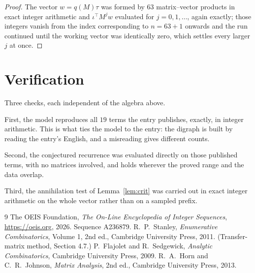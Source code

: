 \documentclass[11pt,a4paper]{article}
\theoremstyle{plain}
\theoremstyle{definition}
\begin{document}
\begin{proof}
The vector $w=q(M)\tau$ was formed by $63$ matrix--vector products in exact integer
arithmetic and $\iota^{\!\top}M^{j}w$ evaluated for $j=0,1,\dots$, again exactly; those
integers vanish from the index corresponding to $n=63+1$ onwards and the run continued
until the working vector was identically zero, which settles every larger $j$ at once.
\end{proof}

\section{Verification}

Three checks, each independent of the algebra above.

First, the model reproduces all $19$ terms the entry publishes, exactly, in integer
arithmetic. This is what ties the model to the entry: the digraph is built by reading the
entry's English, and a misreading gives different counts.

Second, the conjectured recurrence was evaluated directly on those published terms, with no
matrices involved, and holds wherever the proved range and the data overlap.

Third, the annihilation test of Lemma~\ref{lem:crit} was carried out in exact integer
arithmetic on the whole vector rather than on a sampled prefix.

\begin{thebibliography}{9}
 The OEIS Foundation, \emph{The On-Line Encyclopedia of Integer
Sequences}, \url{https://oeis.org}, 2026. Sequence A236879.
 R.~P.~Stanley, \emph{Enumerative Combinatorics}, Volume 1, 2nd ed.,
Cambridge University Press, 2011. (Transfer-matrix method, Section 4.7.)
 P.~Flajolet and R.~Sedgewick, \emph{Analytic Combinatorics}, Cambridge
University Press, 2009.
 R.~A.~Horn and C.~R.~Johnson, \emph{Matrix Analysis}, 2nd ed., Cambridge
University Press, 2013.
\end{thebibliography}
\end{document}
